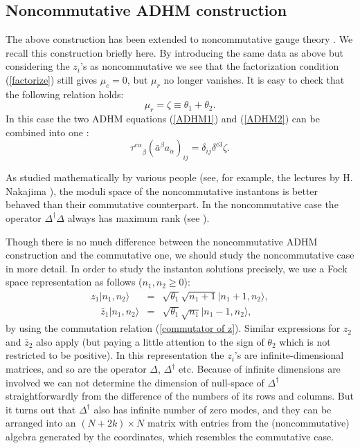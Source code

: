 \documentclass[a4paper,a4paper]{article}
\begin{document}
\subsection{Noncommutative ADHM construction}

The above construction has been extended to noncommutative gauge
theory \cite{Schwarz}. We recall this construction briefly here.
By introducing the same data as above but considering the $z_i$'s
as noncommutative we see that the factorization condition
(\ref{factorize}) still gives $\mu_c=0$, but $\mu_r$ no longer
vanishes. It is easy to check that the following relation holds:
\begin{equation} \mu_r=\zeta\equiv\theta_1+\theta_2.
\end{equation}
In this case the two ADHM equations (\ref{ADHM1}) and
(\ref{ADHM2}) can be combined into one \cite{Paperd}:
\begin{equation}
\label{ADHM} \tau^{c\dot\alpha}{}_{\dot\beta}(\bar a^{\dot\beta}
a_{\dot\alpha})_{ij}=\delta_{ij}\delta^{c3}\zeta.
\end{equation}

As studied mathematically by various people (see, for example, the
lectures by H. Nakajima \cite{Nakajima}), the moduli space of the
noncommutative instantons is better behaved than their commutative
counterpart. In the noncommutative case the operator
$\Delta^\dagger\Delta$ always has maximum rank (see
\cite{Reviewa}).

Though there is no much difference between the noncommutative ADHM
construction and the commutative one, we should study the
noncommutative case in more detail. In order to study the
instanton solutions precisely, we use a Fock space representation
as follows ($n_1, n_2\geq 0$):
\begin{eqnarray}
z_1|n_1,n_2\rangle & = &
\sqrt{\theta_1}\sqrt{n_1+1}|n_1+1,n_2\rangle,
\\
\quad\bar z_1|n_1,n_2\rangle & =&
\sqrt{\theta_1}\sqrt{n_1}|n_1-1,n_2 \rangle,
\end{eqnarray}
by using the commutation relation (\ref{commutator of z}). Similar
expressions for $z_2$ and $\bar z_2$ also apply (but paying a
little attention to the sign of $\theta_2$ which is not restricted
to be positive). In this representation the $z_i$'s are
infinite-dimensional matrices, and so are the operator $\Delta$,
$\Delta^\dag$ etc. Because of infinite dimensions are involved we
can not determine the dimension of null-space of $\Delta^\dag$
straightforwardly from the difference of the numbers of its rows
and columns. But it turns out that $\Delta^\dag$ also has infinite
number of zero modes, and they can be arranged into an
$(N+2k)\times N$ matrix with entries from the (noncommutative)
algebra generated by the coordinates, which resembles the
commutative case.
\end{document}
